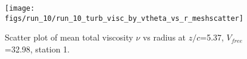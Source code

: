 \begin{figure}[H]
\centering
\texttt{[image: figs/run\_10/run\_10\_turb\_visc\_by\_vtheta\_vs\_r\_meshscatter]}
\caption{Scatter plot of mean total viscosity $\nu$ vs radius at $z/c$=5.37, $V_{free}$=32.98, station 1.}
\label{fig:run_10_turb_visc_by_vtheta_vs_r_meshscatter}
\end{figure}


